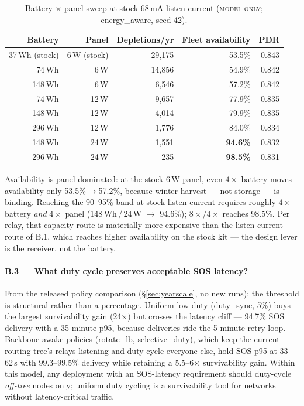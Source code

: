 \documentclass[11pt]{article}
\newcommand{\modelonly}{\textsc{model-only}}
\begin{document}
\begin{table}[h]
\centering\small
\begin{tabular}{@{}rrrrr@{}}
\toprule
Battery & Panel & Depletions/yr & Fleet availability & PDR \\
\midrule
37\,Wh (stock) & 6\,W (stock) & 29{,}175 & 53.5\% & 0.843 \\
74\,Wh & 6\,W & 14{,}856 & 54.9\% & 0.842 \\
148\,Wh & 6\,W & 6{,}546 & 57.2\% & 0.842 \\
74\,Wh & 12\,W & 9{,}657 & 77.9\% & 0.835 \\
148\,Wh & 12\,W & 4{,}014 & 79.9\% & 0.835 \\
296\,Wh & 12\,W & 1{,}776 & 84.0\% & 0.834 \\
148\,Wh & 24\,W & 1{,}551 & \textbf{94.6\%} & 0.832 \\
296\,Wh & 24\,W & 235 & \textbf{98.5\%} & 0.831 \\
\bottomrule
\end{tabular}
\caption{Battery $\times$ panel sweep at stock 68\,mA listen current
(\modelonly; energy\_aware, seed 42).}
\end{table}

Availability is panel-dominated: at the stock 6\,W panel, even $4\times$
battery moves availability only 53.5\%$\to$57.2\%, because winter harvest ---
not storage --- is binding. Reaching the 90--95\% band at stock listen
current requires roughly $4\times$ battery \emph{and} $4\times$ panel
(148\,Wh\,/\,24\,W $\to$ 94.6\%); $8\times$/$4\times$ reaches 98.5\%. Per
relay, that capacity route is materially more expensive than the
listen-current route of B.1, which reaches higher availability on the stock
kit --- the design lever is the receiver, not the battery.

\paragraph{B.3 --- What duty cycle preserves acceptable SOS latency?}
From the released policy comparison (\S\ref{sec:yearscale}, no new runs): the
threshold is structural rather than a percentage. Uniform low-duty
(duty\_sync, 5\%) buys the largest survivability gain (24$\times$) but
crosses the latency cliff --- 94.7\% SOS delivery with a 35-minute p95,
because deliveries ride the 5-minute retry loop. Backbone-awake policies
(rotate\_lb, selective\_duty), which keep the current routing tree's relays
listening and duty-cycle everyone else, hold SOS p95 at 33--62\,s with
99.3--99.5\% delivery while retaining a 5.5--6$\times$ survivability gain.
Within this model, any deployment with an SOS-latency requirement should
duty-cycle \emph{off-tree} nodes only; uniform duty cycling is a
survivability tool for networks without latency-critical traffic.
\end{document}
